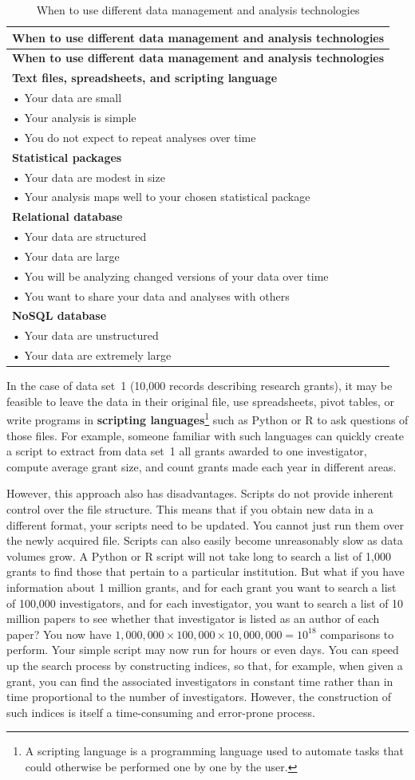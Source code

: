 \documentclass[]{krantz}
\begin{document}
\begin{longtable}[]{@{}l@{}}
\caption{\label{tab:table4-1} When to use different data management and
analysis technologies}\tabularnewline
\toprule
\textbf{When to use different data management and analysis
technologies}\tabularnewline
\midrule
\endfirsthead
\toprule
\textbf{When to use different data management and analysis
technologies}\tabularnewline
\midrule
\endhead
\textbf{Text files, spreadsheets, and scripting language}\tabularnewline
• Your data are small\tabularnewline
• Your analysis is simple\tabularnewline
• You do not expect to repeat analyses over time\tabularnewline
\textbf{Statistical packages}\tabularnewline
• Your data are modest in size\tabularnewline
• Your analysis maps well to your chosen statistical
package\tabularnewline
\textbf{Relational database}\tabularnewline
• Your data are structured\tabularnewline
• Your data are large\tabularnewline
• You will be analyzing changed versions of your data over
time\tabularnewline
• You want to share your data and analyses with others\tabularnewline
\textbf{NoSQL database}\tabularnewline
• Your data are unstructured\tabularnewline
• Your data are extremely large\tabularnewline
\bottomrule
\end{longtable}

\vspace*{-8pt} In the case of data set~1 (10,000 records describing
research grants), it may be feasible to leave the data in their original
file, use spreadsheets, pivot tables, or write programs in
\textbf{scripting languages}\footnote{A scripting language is a
  programming language used to automate tasks that could otherwise be
  performed one by one by the user.} such as Python or R to ask
questions of those files. For example, someone familiar with such
languages can quickly create a script to extract from data set~1 all
grants awarded to one investigator, compute average grant size, and
count grants made each year in different areas.

However, this approach also has disadvantages. Scripts do not provide
inherent control over the file structure. This means that if you obtain
new data in a different format, your scripts need to be updated. You
cannot just run them over the newly acquired file. Scripts can also
easily become unreasonably slow as data volumes grow. A Python or R
script will not take long to search a list of 1,000 grants to find those
that pertain to a particular institution. But what if you have
information about 1 million grants, and for each grant you want to
search a list of 100,000 investigators, and for each investigator, you
want to search a list of 10 million papers to see whether that
investigator is listed as an author of each paper? You now have
\(1{,}000{,}000 \times 100{,}000 \times 10{,}000{,}000 = 10^{18}\)
comparisons to perform. Your simple script may now run for hours or even
days. You can speed up the search process by constructing indices, so
that, for example, when given a grant, you can find the associated
investigators in constant time rather than in time proportional to the
number of investigators. However, the construction of such indices is
itself a time-consuming and error-prone process.
\end{document}

